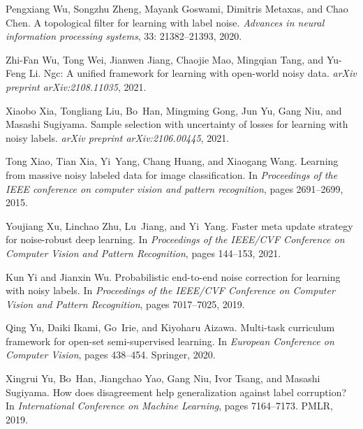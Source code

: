 \documentclass{bmvc2k}
\begin{document}
\begin{thebibliography}{46}
Pengxiang Wu, Songzhu Zheng, Mayank Goswami, Dimitris Metaxas, and Chao Chen.
\newblock A topological filter for learning with label noise.
\newblock \emph{Advances in neural information processing systems},
  33: 21382--21393, 2020.

Zhi-Fan Wu, Tong Wei, Jianwen Jiang, Chaojie Mao, Mingqian Tang, and Yu-Feng
  Li.
\newblock Ngc: A unified framework for learning with open-world noisy data.
\newblock \emph{arXiv preprint arXiv:2108.11035}, 2021.

Xiaobo Xia, Tongliang Liu, Bo~Han, Mingming Gong, Jun Yu, Gang Niu, and Masashi
  Sugiyama.
\newblock Sample selection with uncertainty of losses for learning with noisy
  labels.
\newblock \emph{arXiv preprint arXiv:2106.00445}, 2021.

Tong Xiao, Tian Xia, Yi~Yang, Chang Huang, and Xiaogang Wang.
\newblock Learning from massive noisy labeled data for image classification.
\newblock In \emph{Proceedings of the IEEE conference on computer vision and
  pattern recognition}, pages 2691--2699, 2015.

Youjiang Xu, Linchao Zhu, Lu~Jiang, and Yi~Yang.
\newblock Faster meta update strategy for noise-robust deep learning.
\newblock In \emph{Proceedings of the IEEE/CVF Conference on Computer Vision
  and Pattern Recognition}, pages 144--153, 2021.

Kun Yi and Jianxin Wu.
\newblock Probabilistic end-to-end noise correction for learning with noisy
  labels.
\newblock In \emph{Proceedings of the IEEE/CVF Conference on Computer Vision
  and Pattern Recognition}, pages 7017--7025, 2019.

Qing Yu, Daiki Ikami, Go~Irie, and Kiyoharu Aizawa.
\newblock Multi-task curriculum framework for open-set semi-supervised
  learning.
\newblock In \emph{European Conference on Computer Vision}, pages 438--454.
  Springer, 2020.

Xingrui Yu, Bo~Han, Jiangchao Yao, Gang Niu, Ivor Tsang, and Masashi Sugiyama.
\newblock How does disagreement help generalization against label corruption?
\newblock In \emph{International Conference on Machine Learning}, pages
  7164--7173. PMLR, 2019.


\end{thebibliography}
\end{document}
